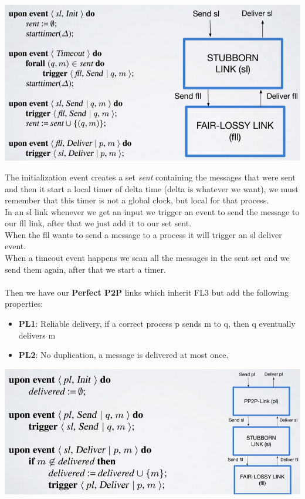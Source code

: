 \documentclass[11pt, a4paper]{article}
\begin{document}
\begin{center}
    \includegraphics[scale=0.6]{img/links/slalgo.png}
\end{center}
The initialization event creates a set \textit{sent} containing the messages that were sent and then it start a local timer of delta time (delta is whatever we want), we must remember that this timer is not a global clock, but local for that process.\\
In an sl link whenever we get an input we trigger an event to send the message to our fll link, after that we just add it to our set sent.\\
When the fll wants to send a message to a process it will trigger an sl deliver event.\\
When a timeout event happens we scan all the messages in the sent set and we send them again, after that we start a timer.
\\\\
Then we have our \textbf{Perfect P2P} links which inherit FL3 but add the following properties:
\begin{itemize}
    \item \textbf{PL1}: Reliable delivery, if a correct process p sends m to q, then q eventually delivers m
    \item \textbf{PL2}: No duplication, a message is delivered at most once.
\end{itemize}
\begin{center}
    \includegraphics[scale=0.5]{img/links/p2p.png}
\end{center}
\end{document}

